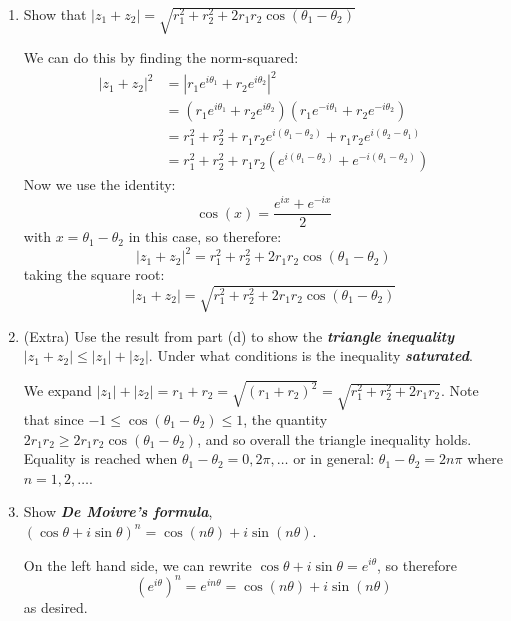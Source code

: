 \documentclass[10pt]{article}
\begin{document}
	\begin{enumerate}[label=\alph*),resume ]
		\item Show that $|z_1 + z_2| = \sqrt{r_1^2 + r_2^2 + 2r_1r_2\cos(\theta_1 - \theta_2)}$  

			\begin{solution}
				We can do this by finding the norm-squared:
				\begin{align*}
					|z_1 + z_2|^2 &= |r_1e^{i \theta_1} + r_2e^{i \theta_2}|^2\\
								  &= (r_1e^{i \theta_1} + r_2e^{i \theta_2})(r_1e^{-i\theta_1} + r_2e^{-i 
								  \theta_2})\\
								  &= r_1^2 + r_2^2 + r_1r_2 e^{i(\theta_1 - \theta_2)} + r_1r_2 e^{i(\theta_2
								  - \theta_1)}\\
								  &= r_1^2 + r_2^2 + r_1r_2\left( e^{i (\theta_1 - \theta_2)} + e^{-i(
								  \theta_1 - \theta_2)}\right)
				\end{align*}	
				Now we use the identity:
				\[
					\cos(x) = \frac{e^{ix} + e^{-ix}}{2}
				\]
				with $x = \theta_1 - \theta_2$ in this case, so therefore:
				\[
				|z_1 + z_2|^2 = r_1^2 + r_2^2 + 2r_1r_2\cos(\theta_1 - \theta_2)
				\] 
				taking the square root:
				\[
				|z_1 + z_2| = \sqrt{r_1^2 + r_2^2 + 2r_1r_2\cos(\theta_1 - \theta_2)} 
				\] 
			\end{solution}
		\item (Extra) Use the result from part (d) to show the \textbf{\textit{triangle inequality}} $|z_1 + z_2|
			\le |z_1| + |z_2|$. Under what conditions is the inequality \textbf{\textit{saturated}}.

			\begin{solution}
				We expand $|z_1| + |z_2| = r_1 + r_2 = \sqrt{(r_1 + r_2)^2} = \sqrt{r_1^2 + r_2^2 + 2r_1r_2}$.
				Note that since $-1 \le \cos(\theta_1 - \theta_2) \le 1$, the quantity $2r_1r_2 \ge 
				2r_1r_2\cos(\theta_1 - \theta_2)$, and so overall the triangle inequality holds. Equality is 
				reached when $\theta_1 - \theta_2 = 0, 2\pi, \dots$ or in general: $\theta_1 - \theta_2 = 2n \pi$
				where $n = 1, 2, \dots$.
			\end{solution}
		\item Show \textbf{\textit{De Moivre's formula}}, $(\cos \theta + i \sin \theta)^n = \cos(n \theta) + i
			\sin (n\theta)$. 

			\begin{solution}
				On the left hand side, we can rewrite $\cos \theta + i \sin \theta = e^{i \theta}$, so therefore
				\[
					(e^{i \theta})^n = e^{in \theta} = \cos(n \theta) + i \sin(n \theta)
				\] 
				as desired. 
			\end{solution}
	\end{enumerate}
\end{document}
